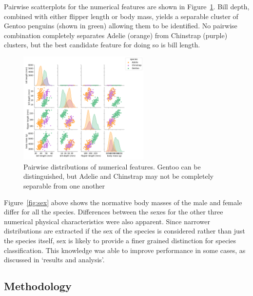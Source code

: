 \documentclass[a4paper, 11pt]{article}
\begin{document}
Pairwise scatterplots for the numerical features are shown in Figure~\ref{fig:pairwise}. 
Bill depth, combined with either flipper length or body mass, 
yields a separable cluster of Gentoo penguins (shown in green) allowing them to be identified. 
No pairwise combination completely separates Adelie (orange) from Chinstrap (purple) clusters, 
but the best candidate feature for doing so is bill length.

\begin{figure} %
  \centering
  \vspace{-1\baselineskip} %
  \includegraphics[width=0.58\textwidth]{pairwise.png} %
  \vspace{-1.5\baselineskip} %
  \caption{\centering\linespread{0.8}\selectfont Pairwise distributions of numerical features. Gentoo can be distinguished, 
  but Adelie and Chinstrap may not be completely separable from one another}
  \vspace{-2.5\baselineskip} %
  \label{fig:pairwise}
\end{figure}

Figure~\ref{fig:sex} above shows the normative body masses of the male and female differ for all the species. 
Differences between the sexes for the other three numerical physical characteristics were also apparent. 
Since narrower distributions are extracted if the sex of the species is considered rather than just the species itself, 
sex is likely to provide a finer grained distinction for species classification. 
This knowledge was able to improve performance in some cases, as discussed in `results and analysis'. 

\subsection*{Methodology}
\end{document}
